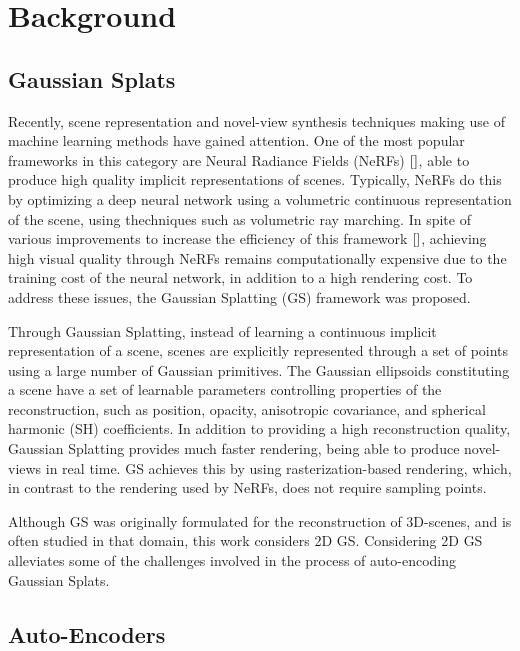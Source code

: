 \section{Background}
\label{sec:background}

\subsection{Gaussian Splats}
\label{bg-gs}
Recently, scene representation and novel-view synthesis techniques making use of machine learning methods have gained attention. One of the most popular frameworks in this category are Neural Radiance Fields (NeRFs) $\cite{}{}$, able to produce high quality implicit representations of scenes. Typically, NeRFs do this by optimizing a deep neural network using a volumetric continuous representation of the scene, using thechniques such as volumetric ray marching. In spite of various improvements to increase the efficiency of this framework $\cite{}{}$, achieving high visual quality through NeRFs remains computationally expensive due to the training cost of the neural network, in addition to a high rendering cost. To address these issues, the Gaussian Splatting (GS) framework was proposed.

Through Gaussian Splatting, instead of learning a continuous implicit representation of a scene, scenes are explicitly represented through a set of points using a large number of Gaussian primitives. The Gaussian ellipsoids constituting a scene have a set of learnable parameters controlling properties of the reconstruction, such as position, opacity, anisotropic covariance, and spherical harmonic (SH) coefficients. In addition to providing a high reconstruction quality, Gaussian Splatting provides much faster rendering, being able to produce novel-views in real time. GS achieves this by using rasterization-based rendering, which, in contrast to the rendering used by NeRFs, does not require sampling points.

Although GS was originally formulated for the reconstruction of 3D-scenes, and is often studied in that domain, this work considers 2D GS. Considering 2D GS alleviates some of the challenges involved in the process of auto-encoding Gaussian Splats.

\subsection{Auto-Encoders}


\label{bg-ae}